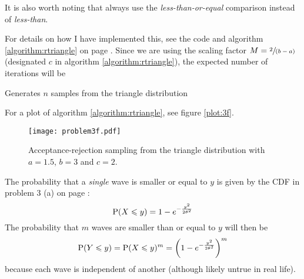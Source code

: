 \documentclass[a4paper,english,12pt]{article}
\begin{document}
It is also worth noting that \cite{von1961various, stanford} always use the
\textit{less-than-or-equal} comparison instead of \textit{less-than}.

For details on how I have implemented this, see the code and algorithm
\ref{algorithm:rtriangle} on page \pageref{algorithm:rtriangle}. Since we are
using the scaling factor $M = \sfrac{2}{(b-a)}$ (designated $c$ in algorithm
\ref{algorithm:rtriangle}), the expected number of iterations will be

\begin{algorithm}
  \caption{Generates $n$ samples from the triangle distribution}
  \label{algorithm:rtriangle}
  \begin{algorithmic}[1]
        \State {}
      \Else
        \State {}
      \EndIf
    \EndFunction
        \Repeat
           
      \EndFor
      \State {}
    \EndFunction
  \end{algorithmic}
\end{algorithm}

For a plot of algorithm \vref{algorithm:rtriangle}, see figure \vref{plot:3f}.

\begin{figure}
  \centering
  \texttt{[image: problem3f.pdf]}
  \caption{Acceptance-rejection sampling from the triangle distribution with
  $a=1.5$, $b=3$ and $c=2$.}
  \label{plot:3f}
\end{figure}

The probability that a \textit{single} wave is smaller or equal to $y$ is given
by the CDF in problem 3 (a) on page \pageref{problem:3a}:
\[
  \mathrm{P}(X\leqslant y) = 1 - e^{-\frac{y^2}{2\theta^2}}
\]
The probability that $m$ waves are smaller than or equal to $y$ will then be
\[
  \mathrm{P}(Y \leqslant y)
    = \mathrm{P}(X\leqslant y)^m
    = \left( 1 - e^{-\frac{y^2}{2\theta^2}} \right)^m
\]
because each wave is independent of another (although likely untrue in real
life).
\end{document}
